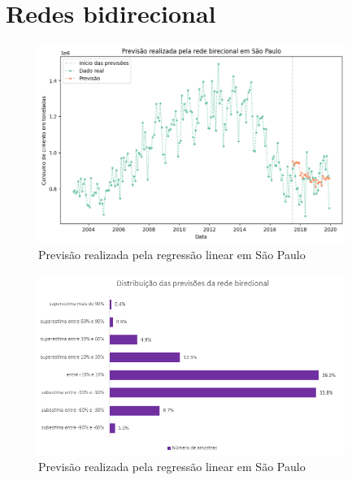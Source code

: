 \section{Redes bidirecional}

\begin{figure}[H]
    \centering
    \includegraphics[width=10cm]{../figuras/graficos/bi/prev-sp-bi.png}
    \caption{Previsão realizada pela regressão linear em São Paulo}
    \label{consumo-sp}
\end{figure}

\begin{figure}[H]
    \centering
    \includegraphics[width=10cm]{../figuras/graficos/bi/erro-perc-bi.png}
    \caption{Previsão realizada pela regressão linear em São Paulo}
    \label{consumo-sp}
\end{figure}